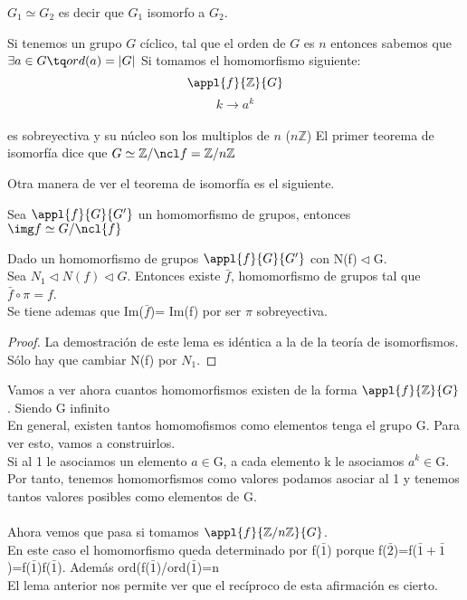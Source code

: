 \documentclass[nochap]{apuntes}
\newenvironment{notacion}[1][Notación:]{\begin{trivlist}
\item[\hskip \labelsep {\bfseries #1}]}{\end{trivlist}}
\begin{document}
\begin{notacion}
$G_1 \simeq G_2$ es decir que $G_1$ isomorfo a $G_2$.
\end{notacion}

\begin{example}
Si tenemos un grupo $G$ cíclico, tal que el orden de $G$ es $n$ entonces sabemos que
$\exists a \in G \tq ord(a) = |G|$
Si tomamos el homomorfismo siguiente:\\
$$\appl{f}{\mathbb{Z}}{G}$$
$$k \longrightarrow a^k$$\\
es sobreyectiva y su núcleo son los multiplos de $n$ ($n\mathbb{Z}$)
El primer teorema de isomorfía dice que $G \simeq \mathbb{Z}/\ncl f  = \mathbb{Z}/n\mathbb{Z}$
\end{example}

Otra manera de ver el teorema de isomorfía es el siguiente.
\begin{theorem}
Sea $\appl{f}{G}{G'}$ un homomorfismo de grupos, entonces $\img f \simeq G/\ncl{f}$
\end{theorem}

\begin{lemma}
 Dado un homomorfismo de grupos $\appl{f}{G}{G'}$  con N(f)$\vartriangleleft$G.\\
 Sea $N_1 \vartriangleleft N(f) \vartriangleleft G$. Entonces existe $\bar{f}$, homomorfismo de grupos tal que $\bar{f}\circ\pi=f$.\\
 Se tiene ademas que Im($\bar{f}$)= Im(f) por ser $\pi$  sobreyectiva.
\end{lemma}
\begin{proof}
 La demostración de este lema es idéntica a la de la teoría de isomorfismos. Sólo hay que cambiar N(f) por $N_1$.
\end{proof}

Vamos a ver ahora cuantos homomorfismos existen de la forma $\appl{f}{\mathbb{Z}}{G}$. Siendo G infinito\\
En general, existen tantos homomofismos como elementos tenga el grupo G. Para ver esto, vamos a construirlos.\\
Si al 1 le asociamos un elemento $a \in$G, a cada elemento k le asociamos $a^{k}\in$G. Por tanto, tenemos homomorfismos como valores
podamos asociar al 1 y tenemos tantos valores posibles como elementos de G.\\
\\
Ahora vemos que pasa si tomamos $\appl{f}{\mathbb{Z}/n\mathbb{Z}}{G}$. \\
En este caso el homomorfismo queda determinado por f($\bar{1}$) porque
f($\bar{2}$)=f($\bar{1}+\bar{1}$)=f($\bar{1}$)f($\bar{1}$). Además ord(f($\bar{1}$)/ord($\bar{1}$)=n\\
El lema anterior nos permite ver que el recíproco de esta afirmación es cierto.\\
\end{document}
